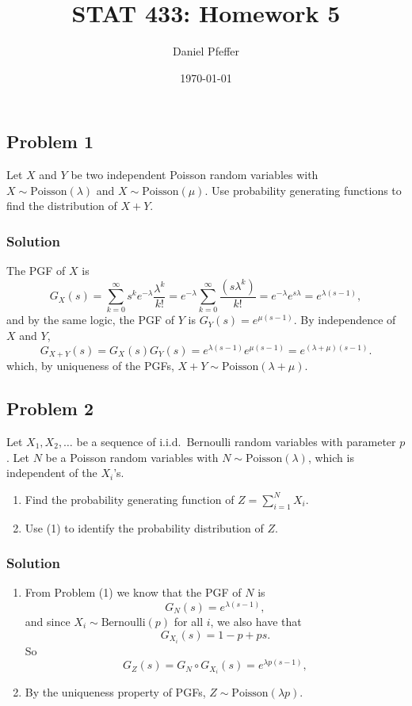 \documentclass[oneside, a4paper]{amsart}
\title{STAT 433: Homework 5}
\author{Daniel Pfeffer}
\date{\today}
\newcommand{\Pois}{\mathrm{Poisson}}
\newcommand{\Ber}{\mathrm{Bernoulli}}
\begin{document}
\maketitle

\subsection*{Problem 1}

Let $X$ and $Y$ be two independent Poisson random variables with $X \sim \Pois(\lambda)$ and $X \sim \Pois(\mu)$. Use probability generating functions to find the distribution of $X+Y$. 

\subsubsection*{Solution}

The PGF of $X$ is
\[
	G_X(s) = \sum_{k=0}^\infty s^k e^{-\lambda} \frac{\lambda^k}{k!} = e^{-\lambda} \sum_{k=0}^\infty \frac{(s\lambda^k)}{k!} = e^{-\lambda} e^{s\lambda} = e^{\lambda(s-1)},
\]
and by the same logic, the PGF of $Y$ is $G_Y(s) =  e^{\mu(s-1)}$. By independence of $X$ and $Y$,
\[
	G_{X+Y}(s) = G_X(s)G_Y(s) = e^{\lambda(s-1)}e^{\mu(s-1)} = e^{(\lambda + \mu)(s-1)}.
\]
which, by uniqueness of the PGFs, $X+Y\sim \Pois(\lambda + \mu)$.

\subsection*{Problem 2}

Let $X_1, X_2, \dotsc$ be a sequence of i.i.d.\ Bernoulli random variables with parameter $p$. Let $N$ be a Poisson random variables with $N \sim \Pois(\lambda)$, which is independent of the $X_i$'s. 
\begin{enumerate}
\item
Find the probability generating function of $Z=\sum_{i=1}^N X_i$.
\item
Use (1) to identify the probability distribution of $Z$.  
\end{enumerate}

\subsubsection*{Solution}
\begin{enumerate}
\item
From Problem (1) we know that the PGF of $N$ is 
\[
	G_N(s) = e^{\lambda(s-1)}, 
\]
and since $X_i \sim \Ber(p)$ for all $i$, we also have that
\[
	G_{X_i}(s) = 1-p + ps.
\]
So
\[
	G_Z(s) = G_N \circ G_{X_i}(s) = e^{\lambda p(s-1)},
\]
\item
By the uniqueness property of PGFs,   $Z \sim \Pois(\lambda p)$.
\end{enumerate}
\end{document}
